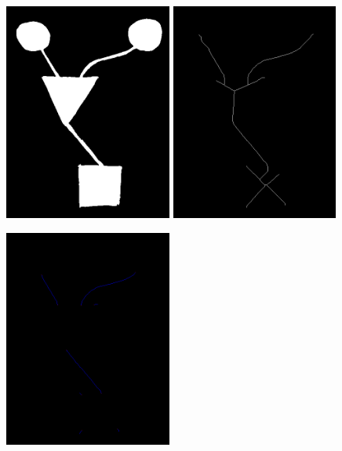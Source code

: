 \documentclass[makeidx, a4paper, 14pt]{extarticle}
\begin{document}
\begin{figure}[H]
    \includegraphics[width=55mm]{handwritten_2_processed_image.png}
    \includegraphics[width=55mm]{handwritten_2_image_skelet.png}
\end{figure}

\begin{figure}[H]
        \centering
        \includegraphics[width=55mm]{handwritten_2_classified_pixels.png}
\end{figure}
\end{document}
